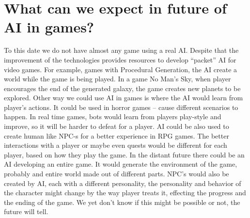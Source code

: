 \documentclass[12pt,twoside,english,a4paper]{article}
\begin{document}
\section{What can we expect in future of AI in games?} \label{4part}

To this date we do not have almost any game using a real AI.
Despite that the improvement of the technologies provides resources to develop “packet” AI for video games.
For example, games with Procedural Generation, the AI create a world while the game is being played. In a game No Man’s Sky, when player encourages
the end of the generated galaxy, the game creates new planets to be explored. Other way we could use AI in games is where the AI would learn from player’s actions.
It could be used in horror games – cause different scenarios to happen. In real time games, bots would learn from players play-style and improve,
so it will be harder to defeat for a player. AI could be also used to create human like NPC-s for a better experience in RPG games.
The better interactions with a player or maybe even quests would be different for each player, based on how they play the game.
In the distant future there could be an AI developing an entire game. It would generate the environment of the game, probably and entire world
made out of different parts. NPC’s would also be created by AI, each with a different personality, the personality and behavior of the character
might change by the way player treats it, effecting the progress and the ending of the game. We yet don’t know if this might be possible or not,
the future will tell.










\end{document}
